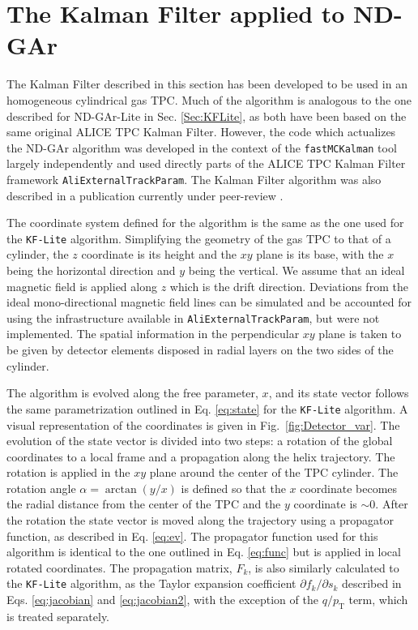 \section{The Kalman Filter applied to ND-GAr}
\label{Sec:KalGAr}
The Kalman Filter described in this section has been developed to be used in an homogeneous cylindrical gas TPC. Much of the algorithm is analogous to the one described for ND-GAr-Lite in Sec. \ref{Sec:KFLite}, as both have been based on the same original ALICE TPC Kalman Filter. However, the code which actualizes the ND-GAr algorithm was developed in the context of the \texttt{fastMCKalman} tool largely independently and used directly parts of the ALICE TPC Kalman Filter framework \texttt{AliExternalTrackParam}. The Kalman Filter algorithm was also described in a publication currently under peer-review \cite{Battisti:2024nqq}.

The coordinate system defined for the algorithm is the same as the one used for the \texttt{KF-Lite} algorithm. Simplifying the geometry of the gas TPC to that of a cylinder, the $z$ coordinate is its height and the $xy$ plane is its base, with the $x$ being the horizontal direction and $y$ being the vertical. We assume that an ideal magnetic field is applied along $z$ which is the drift direction. Deviations from the ideal mono-directional magnetic field lines can be simulated and be accounted for using the infrastructure available in \texttt{AliExternalTrackParam}, but were not implemented. The spatial information in the perpendicular $xy$ plane is taken to be given by detector elements disposed in radial layers on the two sides of the cylinder. 

The algorithm is evolved along the free parameter, $x$, and its state vector follows the same parametrization outlined in Eq. \ref{eq:state} for the \texttt{KF-Lite} algorithm. A visual representation of the coordinates is given in Fig.~\ref{fig:Detector_var}. The evolution of the state vector is divided into two steps: a rotation of the global coordinates to a local frame and a propagation along the helix trajectory. The rotation is applied in the $xy$ plane around the center of the TPC cylinder. The rotation angle $\alpha = \arctan (y/x)$ is defined so that the $x$ coordinate becomes the radial distance from the center of the TPC and the $y$ coordinate is $\sim 0$. After the rotation the state vector is moved along the trajectory using a propagator function, as described in Eq. \ref{eq:ev}. The propagator function used for this algorithm is identical to the one outlined in Eq. \ref{eq:func} but is applied in local rotated coordinates. The propagation matrix, $F_k$, is also similarly calculated to the \texttt{KF-Lite} algorithm, as the Taylor expansion coefficient $\partial f_k / \partial s_k$ described in Eqs. \ref{eq:jacobian} and \ref{eq:jacobian2}, with the exception of the $q/p_{\text{T}}$ term, which is treated separately.

